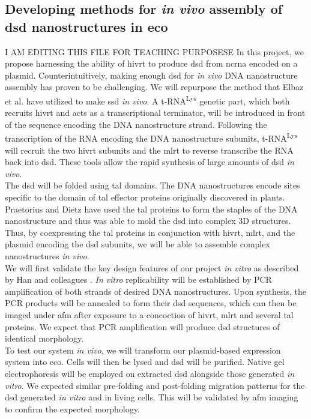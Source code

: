 \documentclass[a4paper]{article}
\begin{document}
\subsection*{Developing methods for \textit{in vivo} assembly of \ac{dsd} nanostructures in \ac{eco}}
I AM EDITING THIS FILE FOR TEACHING PURPOSESE
In this project, we propose harnessing the ability of \ac{hivrt} to produce \ac{dsd} from \ac{ncrna} encoded on a plasmid.
Counterintuitively, making enough \ac{dsd} for \textit{in vivo} DNA nanostructure assembly has proven to be challenging.
We will repurpose the method that Elbaz et al. have utilized to make \ac{ssd} \textit{in vivo}\cite{meth1}.
A t-RNA\textsuperscript{Lys} genetic part, which both recruits \ac{hivrt} and acts as a transcriptional terminator, will be introduced in front of the sequence encoding the DNA nanostructure strand.
Following the transcription of the RNA encoding the DNA nanostructure subunits, t-RNA\textsuperscript{Lys} will recruit the two \ac{hivrt} subunits and the \ac{mlrt} to reverse transcribe the RNA back into \ac{dsd}.
These tools allow the rapid synthesis of large amounts of \ac{dsd} \textit{in vivo}.
\vspace{2 mm}
\\
The \ac{dsd} will be folded using \ac{tal} domains.
The DNA nanostructures encode sites specific to the domain of \ac{tal} effector proteins originally discovered in plants.
Praetorius and Dietz have used the \ac{tal} proteins to form the staples of the DNA nanostructure and thus was able to mold the \ac{dsd} into complex 3D structures\cite{meth2}.
Thus, by coexpressing the \ac{tal} proteins in conjunction with \ac{hivrt}, \ac{mlrt}, and the plasmid encoding the \ac{dsd} subunits, we will be able to assemble complex nanostructures \textit{in vivo}.
\vspace{2 mm}
\\
We will first validate the key design features of our project \textit{in vitro} as described by Han and colleagues \cite{meth3}.
\textit{In vitro} replicability will be established by PCR amplification of both strands of desired DNA nanostructures.
Upon synthesis, the PCR products will be annealed to form their \ac{dsd} sequences, which can then be imaged under \ac{afm} after exposure to a concoction of \ac{hivrt}, \ac{mlrt} and several \ac{tal} proteins.
We expect that PCR amplification will produce \ac{dsd} structures of identical morphology.
\vspace{2 mm}
\\
To test our system \textit{in vivo}, we will transform our plasmid-based expression system into \ac{eco}.
Cells will then be lysed and \ac{dsd} will be purified.
Native gel electrophoresis will be employed on extracted \ac{dsd} alongside those generated \textit{in vitro}.
We expected similar pre-folding and post-folding migration patterns for the \ac{dsd} generated \textit{in vitro} and in living cells.
This will be validated by \ac{afm} imaging to confirm the expected morphology.
\end{document}
